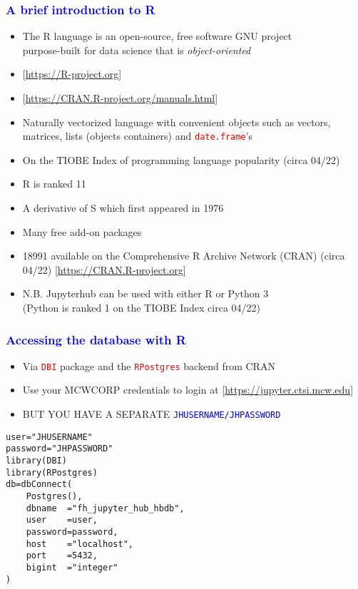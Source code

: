 \documentclass[11pt,pdftex,dvipsnames,usenames]{beamer}
\begin{document}
\begin{frame}[fragile]\frametitle{\bf\textcolor{blue}{A brief introduction to R}}

\begin{itemize}
\item The R language is an open-source, free software GNU project\\
 purpose-built for data science that is {\it object-oriented}
\item \textcolor{PineGreen}{[\href{https://R-project.org}{https://R-project.org}]}
\item \textcolor{PineGreen}{[\href{https://CRAN.R-project.org/manuals.html}{https://CRAN.R-project.org/manuals.html}]}
\item Naturally vectorized language with convenient objects such as vectors,
matrices, lists (objects containers) and 
\textcolor{red}{\texttt{date.frame}}'s
\item On the TIOBE Index of programming language popularity (circa 04/22)
\item R is ranked 11 
\item A derivative of S which first appeared in 1976
\item Many free add-on packages
\item 18991 available on the Comprehensive R Archive Network (CRAN) (circa 04/22) \textcolor{PineGreen}{[\href{https://CRAN.R-project.org}{https://CRAN.R-project.org}]}
\item N.B. Jupyterhub can be used with either R or Python 3\\ 
(Python is ranked 1 on the TIOBE Index circa 04/22)
\end{itemize}

\end{frame}

\begin{frame}[fragile]\frametitle{\bf\textcolor{blue}{Accessing the database with R}}

\begin{itemize}
\item Via \textcolor{red}{\texttt{DBI}} package and the 
\textcolor{red}{\texttt{RPostgres}} backend from CRAN 
\item Use your MCWCORP credentials to login at 
\textcolor{PineGreen}{[\href{https://jupyter.ctsi.mcw.edu}{https://jupyter.ctsi.mcw.edu}]}
\item BUT YOU HAVE A SEPARATE \textcolor{blue}{\texttt{JHUSERNAME/JHPASSWORD}}
\end{itemize}
\begin{verbatim}
user="JHUSERNAME" 
password="JHPASSWORD"
library(DBI)
library(RPostgres)
db=dbConnect(
    Postgres(), 
    dbname  ="fh_jupyter_hub_hbdb",
    user    =user,
    password=password,
    host    ="localhost", 
    port    =5432, 
    bigint  ="integer"
)
\end{verbatim}

\end{frame}
\end{document}
